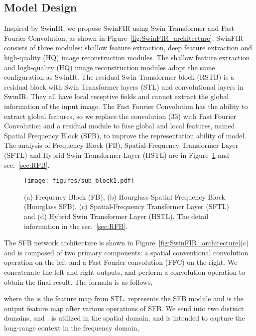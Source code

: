 \documentclass[10pt,twocolumn,letterpaper]{article}
\begin{document}
\subsection{Model Design}
Inspired by SwinIR, we propose SwinFIR using Swin Transformer and Fast Fourier Convolution, as shown in Figure~\ref{fig:SwinFIR_architecture}. SwinFIR consists of three modules: shallow feature extraction, deep feature extraction and high-quality (HQ) image reconstruction modules. The shallow feature extraction and high-quality (HQ) image reconstruction modules adopt the same configuration as SwinIR. The residual Swin Transformer block (RSTB) is a residual block with Swin Transformer layers (STL) and convolutional layers in SwinIR. They all have local receptive fields and cannot extract the global information of the input image. The Fast Fourier Convolution has the ability to extract global features, so we replace the convolution (33) with Fast Fourier Convolution and a residual module to fuse global and local features, named Spatial Frequency Block (SFB), to improve the representation ability of model. The analysis of Frequency Block (FB), Spatial-Frequency Transformer Layer (SFTL) and Hybrid Swin Transformer Layer (HSTL) are in Figure~\ref{fig:SFB_Block} and sec.~\ref{sec:RFB}.


\begin{figure}[t]
	\centering
	\texttt{[image: figures/sub\_block1.pdf]}
	\vspace{-5mm}
	\caption{(a) Frequency Block (FB), (b) Hourglass Spatial Frequency Block (Hourglass SFB), (c) Spatial-Frequency Transformer Layer (SFTL) and (d) Hybrid Swin Transformer Layer (HSTL). The detail information in the sec.~\ref{sec:RFB}. } 
	\label{fig:SFB_Block}
	\vspace{-3mm}
\end{figure}

The SFB network architecture is shown in Figure~\ref{fig:SwinFIR_architecture}(c) and is composed of two primary components: a spatial conventional convolution operation on the left and a Fast Fourier convolution (FFC) on the right. We concatenate the left and right outputs, and perform a convolution operation to obtain the final result. The formula is as follows,

where the  is the feature map from STL.  represents the SFB module and  is the output feature map after various operations of SFB. We send  into two distinct domains,  and .  is utilized in the spatial domain, and  is intended to capture the long-range context in the frequency domain,
\end{document}
